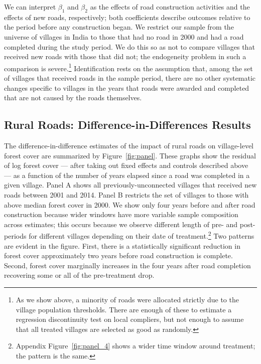 We can interpret $\beta_1$ and $\beta_2$ as the effects of road
construction activities and the effects of new roads, respectively;
both coefficients describe outcomes relative to the period before any
construction began. We restrict our sample from the universe of
villages in India to those that had no road in 2000 and had a road
completed during the study period. We do this so as not to compare
villages that received new roads with those that did not; the
endogeneity problem in such a comparison is severe.\footnote{As we
  show above, a minority of roads were allocated strictly due to the
  village population thresholds. There are enough of these to estimate
  a regression discontinuity test on local compliers, but not enough
  to assume that all treated villages are selected as good as
  randomly.}  Identification rests on the assumption that, among the
set of villages that received roads in the sample period, there are no
other systematic changes specific to villages in the years that roads
were awarded and completed that are not caused by the roads
themselves.

\subsection{Rural Roads: Difference-in-Differences Results }
\label{sec:panel}

The difference-in-difference estimates of the impact of rural roads on
village-level forest cover are summarized by Figure~\ref{fig:panel}.
These graphs show the residual of log forest cover --- after taking out
fixed effects and controls described above --- as a function of the
number of years elapsed since a road was completed in a given
village. Panel A shows all previously-unconnected villages that
received new roads between 2001 and 2014.  Panel B restricts the set
of villages to those with above median forest cover in 2000.  We show
only four years before and after road construction because wider
windows have more variable sample composition across estimates; this
occurs because we observe different length of pre- and post-periods
for different villages depending on their date of
treatment.\footnote{Appendix Figure~\ref{fig:panel_4} shows a wider
  time window around treatment; the pattern is the same.} Two patterns
are evident in the figure.  First, there is a statistically
significant reduction in forest cover approximately two years before
road construction is complete. Second, forest cover marginally
increases in the four years after road completion recovering some or
all of the pre-treatment drop.

